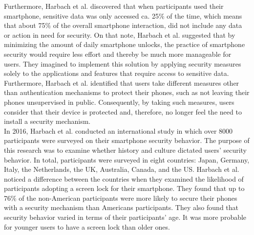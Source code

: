 Furthermore, Harbach et al. \cite{harbach} discovered that when participants used their smartphone, sensitive data was only accessed ca. 25\% of the time, which means that about 75\% of the overall smartphone interaction, did not include any data or action in need for security. On that note, Harbach et al. \cite{harbach} suggested that by minimizing the amount of daily smartphone unlocks, the practice of smartphone security would require less effort and thereby be much more manageable for users. They imagined to implement this solution by applying security measures solely to the applications and features that require access to sensitive data. Furthermore, Harbach et al. \cite{harbach} identified that users take different measures other than authentication mechanisms to protect their phones, such as not leaving their phones unsupervised in public. Consequently, by taking such measures, users consider that their device is protected and, therefore, no longer feel the need to install a security mechanism. \\

In 2016, Harbach et al. \cite{Harbach:2016} conducted an international study in which over 8000 participants were surveyed on their smartphone security behavior. The purpose of this research was to examine whether history and culture dictated users' security behavior. In total, participants were surveyed in eight countries: Japan, Germany, Italy, the Netherlands, the UK, Australia, Canada, and the US. Harbach et al. \cite{Harbach:2016} noticed a difference between the countries when they examined the likelihood of participants adopting a screen lock for their smartphone. They found that up to 76\% of the non-American participants were more likely to secure their phones with a security mechanism than Americans participants. They also found that security behavior varied in terms of their participants' age. It was more probable for younger users to have a screen lock than older ones.\\

